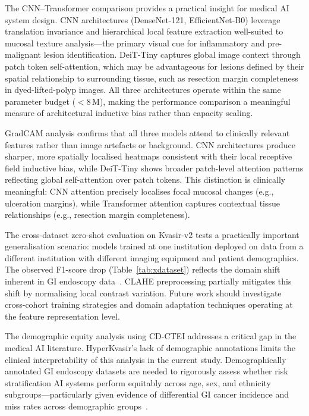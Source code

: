 \documentclass[10pt,a4paper,twocolumn]{article}
\begin{document}
The CNN--Transformer comparison provides a practical insight for medical AI
system design. CNN architectures (DenseNet-121, EfficientNet-B0) leverage
translation invariance and hierarchical local feature extraction well-suited
to mucosal texture analysis---the primary visual cue for inflammatory and
pre-malignant lesion identification. DeiT-Tiny captures global image context
through patch token self-attention, which may be advantageous for lesions
defined by their spatial relationship to surrounding tissue, such as resection
margin completeness in dyed-lifted-polyp images. All three architectures
operate within the same parameter budget ($<$8\,M), making the performance
comparison a meaningful measure of architectural inductive bias rather than
capacity scaling.

GradCAM analysis confirms that all three models attend to clinically relevant
features rather than image artefacts or background. CNN architectures produce
sharper, more spatially localised heatmaps consistent with their local
receptive field inductive bias, while DeiT-Tiny shows broader patch-level
attention patterns reflecting global self-attention over patch tokens. This
distinction is clinically meaningful: CNN attention precisely localises focal
mucosal changes (e.g., ulceration margins), while Transformer attention
captures contextual tissue relationships (e.g., resection margin completeness).

The cross-dataset zero-shot evaluation on Kvasir-v2 tests a practically
important generalisation scenario: models trained at one institution deployed
on data from a different institution with different imaging equipment and
patient demographics. The observed F1-score drop (Table~\ref{tab:xdataset})
reflects the domain shift inherent in GI endoscopy data~\citep{Jahanifar2025}.
CLAHE preprocessing partially mitigates this shift by normalising local
contrast variation. Future work should investigate cross-cohort training
strategies and domain adaptation techniques operating at the feature
representation level.

The demographic equity analysis using CD-CTEI addresses a critical gap in the
medical AI literature. HyperKvasir's lack of demographic annotations limits
the clinical interpretability of this analysis in the current study.
Demographically annotated GI endoscopy datasets are needed to rigorously
assess whether risk stratification AI systems perform equitably across age,
sex, and ethnicity subgroups---particularly given evidence of differential GI
cancer incidence and miss rates across demographic groups~\citep{Kaminski2017}.
\end{document}
